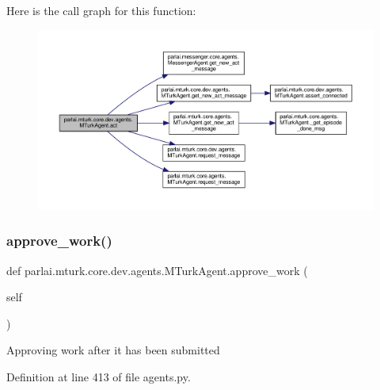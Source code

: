 Here is the call graph for this function\+:
\nopagebreak
\begin{figure}[H]
\begin{center}
\leavevmode
\includegraphics[width=350pt]{classparlai_1_1mturk_1_1core_1_1dev_1_1agents_1_1MTurkAgent_a398631dd8ea8c0960fc9adc8edb0e08b_cgraph}
\end{center}
\end{figure}
\mbox{\label{classparlai_1_1mturk_1_1core_1_1dev_1_1agents_1_1MTurkAgent_adb726f0723f56988385241a17068bea6}} 
\subsubsection{\texorpdfstring{approve\+\_\+work()}{approve\_work()}}
{\footnotesize\ttfamily def parlai.\+mturk.\+core.\+dev.\+agents.\+M\+Turk\+Agent.\+approve\+\_\+work (\begin{DoxyParamCaption}\item[{}]{self }\end{DoxyParamCaption})}

\begin{DoxyVerb}Approving work after it has been submitted\end{DoxyVerb}
 

Definition at line 413 of file agents.\+py.




